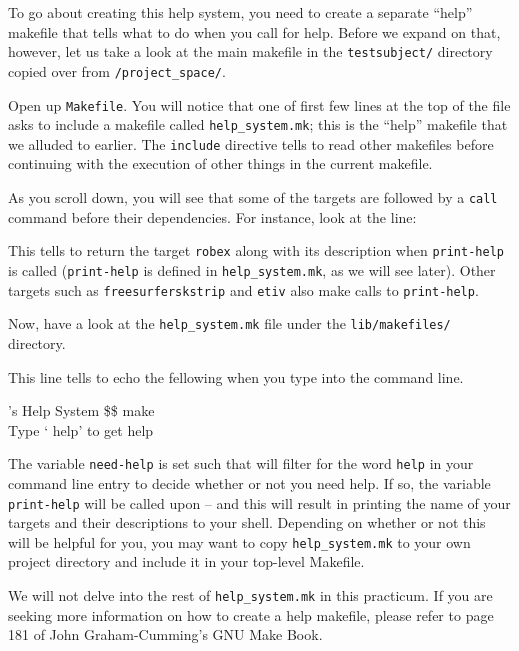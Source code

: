 To go about creating this help system, you need to create a separate ``help'' makefile that tells \maken{} what to do when you call for help. Before we expand on that, however, let us take a look at the main makefile in the \texttt{testsubject/} directory copied over from \texttt{/project_space/}.

Open up \texttt{Makefile}. You will notice that one of first few lines at the top of the file asks \maken{} to include a makefile called \texttt{help_system.mk}; this is the ``help'' makefile that we alluded to earlier. The \texttt{include} directive tells \maken{} to read other makefiles before continuing with the execution of other things in the current makefile.  

As you scroll down, you will see that some of the targets are followed by a \texttt{call} command before their dependencies. For instance, look at the line:

This tells \maken{} to return the target \texttt{robex} along with its description when \texttt{print-help} is called (\texttt{print-help} is defined in \texttt{help_system.mk}, as we will see later). Other targets such as \texttt{freesurferskstrip} and \texttt{etiv} also make calls to \texttt{print-help}.

Now, have a look at the \texttt{help_system.mk} file under the \texttt{lib/makefiles/} directory.  

This line tells \maken{} to echo the fellowing when you type \maken{} into the command line.
\begin{bash}{\maken{}'s Help System}{}
\$\$ make \\
Type `\maken{} help' to get help
\end{bash}

The variable \texttt{need-help} is set such that \maken{} will filter for the word \texttt{help} in your command line entry to decide whether or not you need help. If so, the variable \texttt{print-help} will be called upon -- and this will result in \maken{} printing the name of your targets and their descriptions to your shell. Depending on whether or not this will be helpful for you, you may want to copy \texttt{help_system.mk} to your own project directory and include it in your top-level Makefile. 

We will not delve into the rest of \texttt{help_system.mk} in this practicum. If you are seeking more information on how to create a help makefile, please refer to page 181 of John Graham-Cumming's GNU Make Book. 

